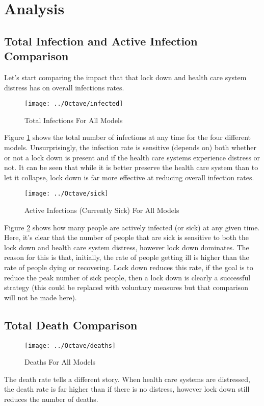 \section{Analysis}
\subsection{Total Infection and Active Infection Comparison}
Let's start comparing the impact that that lock down and health care system distress has on overall infections rates.
\begin{figure}[H]
	\centering
	\texttt{[image: ../Octave/infected]}
	\caption[Total Infections For All Models]{Total Infections For All Models}
	\label{fig:infected}
\end{figure}
Figure \ref{fig:infected} shows the total number of infections at any time for the four different models. Unsurprisingly, the infection rate is sensitive (depends on) both whether or not a lock down is present and if the health care systems experience distress or not. It can be seen that while it is better preserve the health care system than to let it collapse, lock down is far more effective at reducing overall infection rates.
\begin{figure}[H]
	\centering
	\texttt{[image: ../Octave/sick]}
	\caption[Active Infections (Currently Sick) For All Models]{Active Infections (Currently Sick) For All Models}
	\label{fig:sick}
\end{figure}
Figure \ref{fig:sick} shows how many people are actively infected (or sick) at any given time. Here, it's clear that the number of people that are sick is sensitive to both the lock down and health care system distress, however lock down dominates. The reason for this is that, initially, the rate of people getting ill is higher than the rate of people dying or recovering. Lock down reduces this rate, if the goal is to reduce the peak number of sick people, then a lock down is clearly a successful strategy (this could be replaced with voluntary measures but that comparison will not be made here).

\subsection{Total Death Comparison}
\begin{figure}[H]
	\centering
	\texttt{[image: ../Octave/deaths]}
	\caption[Deaths For All Models]{Deaths For All Models}
	\label{fig:deaths}
\end{figure}
The death rate tells a different story. When health care systems are distressed, the death rate is far higher than if there is no distress, however lock down still reduces the number of deaths.
